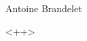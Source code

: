 \documentclass[12pt]{article}
\begin{document}
\begin{titlepage}
\centering 
\vspace*{7cm}
{\textcolor{Red}{\textbf{}}}\\[\baselineskip]
{\Large \textit{}}\\[\baselineskip]
{\Large Antoine Brandelet}
\end{titlepage}

<++>
\end{document}
